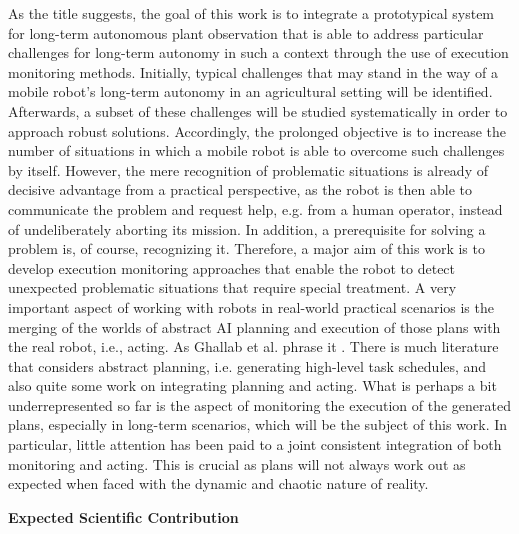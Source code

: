 \documentclass[english, master, utf8]{base/thesis_KBS}
\begin{document}
As the title suggests, the goal of this work is to integrate a prototypical system for long-term autonomous plant observation that is able to address 
particular challenges for long-term autonomy in such a context through the use of execution monitoring methods. Initially, typical challenges that may stand in the way of a mobile
robot's long-term autonomy in an agricultural setting will be identified. Afterwards, a subset of these challenges will be studied systematically in order to 
approach robust solutions. Accordingly, the prolonged objective is to increase the number of situations in which a mobile robot is able to 
overcome such challenges by itself. However, the mere recognition of problematic situations is already of decisive advantage from a practical perspective,
as the robot is then able to communicate the problem and request help, e.g. from a human operator, instead of undeliberately aborting its mission.
In addition, a prerequisite for solving a problem is, of course, recognizing it. Therefore, a major aim of this work is to develop execution monitoring
approaches that enable the robot to detect unexpected problematic situations that require special treatment.\newline
A very important aspect of working with robots in real-world practical scenarios is the merging of the worlds of abstract AI planning and execution of those plans with
the real robot, i.e., acting. As Ghallab et al. phrase it . \cite{GNT:2016} There is much literature that considers abstract planning, i.e. generating high-level
task schedules, and also quite some work on integrating planning and acting. What is perhaps a bit underrepresented so far is the aspect of monitoring the execution of the generated
plans, especially in long-term scenarios, which will be the subject of this work. In particular, little attention has been paid to a joint consistent integration of both monitoring
and acting. \cite{Ingrand:2017} This is crucial as plans will not always work out as expected when faced with the dynamic and chaotic nature of reality.

\vfill
\pagebreak

\textbf{Expected Scientific Contribution}\newline
\end{document}
